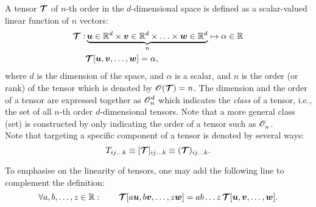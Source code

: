     \begin{definition}[Tensor]\label{def:tensors}
        A tensor $\mathord{\mbox{\boldmath$\mathcal{T}$}}$ of  $n$-th order in the $d$-dimensional space is defined as a scalar-valued linear function of $n$ vectors:
        \begin{equation}
        \begin{aligned}
        \ten{T}: &\underbrace{\tena{u}\in\Real^d\times\tena{v}\in\Real^d\times\ldots  \times\tena{w}\in\Real^d}_n   \mapsto \alpha\in\Real\\
                  &\ten{T}[\tena{u},\tena{v},\ldots,\tena{w}]=\alpha,
        \end{aligned}
        \end{equation}
        where $d$ is the dimension of the space, and $\alpha$ is a scalar, and $n$ is the order (or rank) of the tensor which is denoted by $\mathscr{O}(\mathord{\mbox{\boldmath$\mathcal{T}$}})=n$. The dimension and the order of a tensor are expressed together as $\mathscr{O}_{n}^{d}$ which indicates the \textit{class} of a tensor, i.e., the set of all $n$-th order $d$-dimensional tensors. Note that a more general class (set) is constructed by only indicating the order of a tensor such as $\mathscr{O}_{n}^{}$.\\
        Note that targeting a specific component of a tensor is denoted by several ways:
        \begin{equation}
        	T_{ij\ldots k}\equiv[\mathord{\mbox{\boldmath$\mathcal{T}$}}]_{ij\ldots k}\equiv (\mathord{\mbox{\boldmath$\mathcal{T}$}})_{ij\ldots k}.
        \end{equation}
    \end{definition}
    To emphasise on the linearity of tensors, one may add the following line to complement the definition:
    \begin{equation}
       \forall a,b,\ldots ,z\in \Real:\qquad\ten{T}[a\tena{u},b\tena{v},\ldots,z\tena{w}]=ab\ldots z\,\ten{T}[\tena{u},\tena{v},\ldots,\tena{w}].
    \end{equation}

